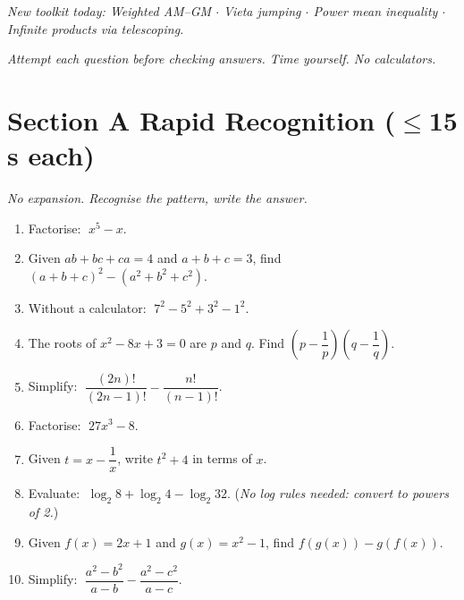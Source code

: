 \documentclass[11pt,a4paper]{article}
\begin{document}
\noindent\textit{New toolkit today: Weighted AM--GM $\cdot$ Vieta jumping $\cdot$ Power mean inequality $\cdot$ Infinite products via telescoping.}

\vspace{2pt}
\noindent\textit{Attempt each question before checking answers. Time yourself. No calculators.}

\section*{Section A \quad Rapid Recognition \hfill{\normalfont\small($\leq$15 s each)}}

\noindent\textit{No expansion. Recognise the pattern, write the answer.}

\begin{enumerate}

\item Factorise: $\;x^5 - x$.

\item Given $ab + bc + ca = 4$ and $a + b + c = 3$, find $(a+b+c)^2 - (a^2+b^2+c^2)$.

\item Without a calculator: $\;7^2 - 5^2 + 3^2 - 1^2$.

\item The roots of $x^2 - 8x + 3 = 0$ are $p$ and $q$.
      Find $\left(p - \dfrac{1}{p}\right)\!\!\left(q - \dfrac{1}{q}\right)$.

\item Simplify: $\;\dfrac{(2n)!}{(2n-1)!} - \dfrac{n!}{(n-1)!}$.

\item Factorise: $\;27x^3 - 8$.

\item Given $t = x - \dfrac{1}{x}$, write $t^2 + 4$ in terms of $x$.

\item Evaluate: $\;\log_2 8 + \log_2 4 - \log_2 32$.
      (\textit{No log rules needed: convert to powers of 2.})

\item Given $f(x) = 2x + 1$ and $g(x) = x^2 - 1$, find $f(g(x)) - g(f(x))$.

\item Simplify: $\;\dfrac{a^2 - b^2}{a - b} - \dfrac{a^2 - c^2}{a - c}$.

\end{enumerate}
\end{document}
